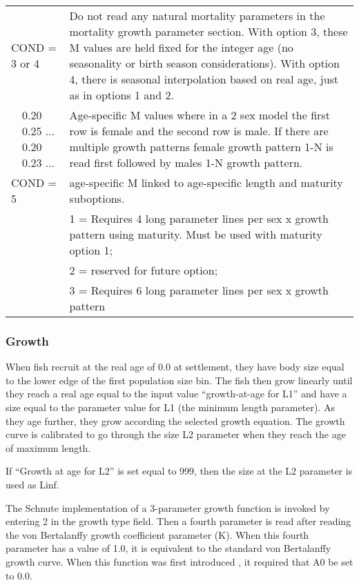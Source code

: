 \begin{longtable}{p{0.5cm} p{2cm} p{12.75cm}}
	\multicolumn{2}{l}{COND = 3 or 4} \Tstrut & Do not read any natural mortality parameters in the mortality growth parameter section.  With option 3, these M values are held fixed for the integer age (no seasonality or birth season considerations). With option 4, there is seasonal interpolation based on real age, just as in options 1 and 2.\\

	& 0.20 0.25 ... 0.20 0.23 ... & Age-specific M values where in a 2 sex model the first row is female and the second row is male. If there are multiple growth patterns female growth pattern 1-N is read first followed by males 1-N growth pattern.\Bstrut\\
	\hline
	
	\multicolumn{2}{l}{COND = 5} \Tstrut & age-specific M linked to age-specific length and maturity suboptions. \\

	&  & 1 = Requires 4 long parameter lines per sex x growth pattern using maturity. Must be used with maturity option 1; \\
	&  & 2 = reserved for future option; \\
	&  & 3 = Requires 6 long parameter lines per sex x growth pattern\Bstrut\\
	\hline
\end{longtable}

\subsubsection{Growth}

When fish recruit at the real age of 0.0 at settlement, they have body size equal to the lower edge of the first population size bin.  The fish then grow linearly until they reach a real age equal to the input value “growth-at-age for L1” and have a size equal to the parameter value for L1 (the minimum length parameter).  As they age further, they grow according the selected growth equation.  The growth curve is calibrated to go through the size L2 parameter when they reach the age of maximum length.
	
If “Growth at age for L2” is set equal to 999, then the size at the L2 parameter is used as Linf. 
	
The Schnute implementation of a 3-parameter growth function is invoked by entering 2 in the growth type field.  Then a fourth parameter is read after reading the von Bertalanffy growth coefficient parameter (K). When this fourth parameter has a value of 1.0, it is equivalent to the standard von Bertalanffy growth curve.  When this function was first introduced , it required that A0 be set to 0.0.
	
